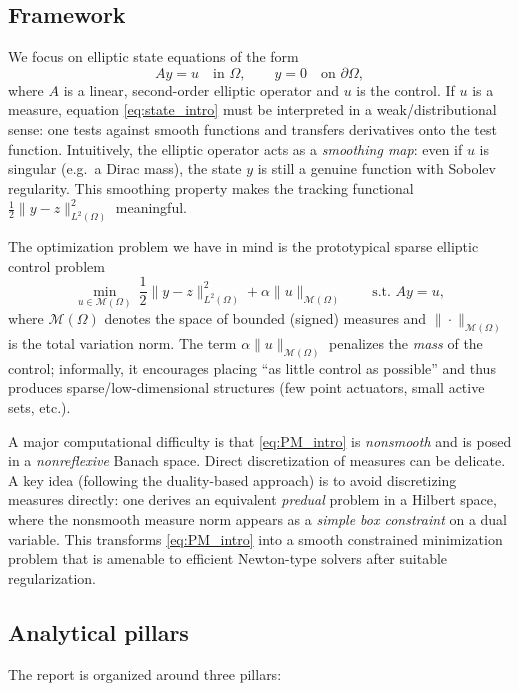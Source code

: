 \documentclass[11pt,a4paper]{article}
\begin{document}
\subsection{Framework}
We focus on elliptic state equations of the form
\begin{equation}\label{eq:state_intro}
Ay = u \quad \text{in }\Omega, 
\qquad y=0 \quad \text{on }\partial\Omega,
\end{equation}
where $A$ is a linear, second-order elliptic operator and $u$ is the control.
If $u$ is a measure, equation \eqref{eq:state_intro} must be interpreted in a weak/distributional sense: one tests against smooth functions and transfers derivatives onto the test function.
Intuitively, the elliptic operator acts as a \emph{smoothing map}:
even if $u$ is singular (e.g.\ a Dirac mass), the state $y$ is still a genuine function with Sobolev regularity.
This smoothing property makes the tracking functional $\frac12\|y-z\|_{L^2(\Omega)}^2$ meaningful.

The optimization problem we have in mind is the prototypical sparse elliptic control problem
\begin{equation}\label{eq:PM_intro}
\min_{u \in \mathcal{M}(\Omega)} 
\ \frac12\|y-z\|_{L^2(\Omega)}^2 + \alpha \|u\|_{\mathcal{M}(\Omega)}
\qquad \text{s.t. } Ay=u,
\end{equation}
where $\mathcal{M}(\Omega)$ denotes the space of bounded (signed) measures and $\|\cdot\|_{\mathcal{M}(\Omega)}$ is the total variation norm.
The term $\alpha\|u\|_{\mathcal{M}(\Omega)}$ penalizes the \emph{mass} of the control; informally, it encourages placing ``as little control as possible'' and thus produces sparse/low-dimensional structures (few point actuators, small active sets, etc.).

A major computational difficulty is that \eqref{eq:PM_intro} is \emph{nonsmooth} and is posed in a \emph{nonreflexive} Banach space.
Direct discretization of measures can be delicate.
A key idea (following the duality-based approach) is to avoid discretizing measures directly:
one derives an equivalent \emph{predual} problem in a Hilbert space, where the nonsmooth measure norm appears as a \emph{simple box constraint} on a dual variable.
This transforms \eqref{eq:PM_intro} into a smooth constrained minimization problem that is amenable to efficient Newton-type solvers after suitable regularization.

\subsection{Analytical pillars}
The report is organized around three pillars:
\end{document}
